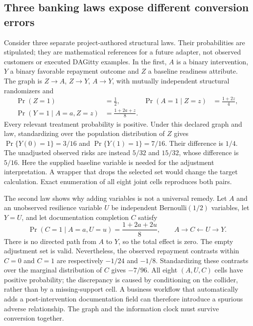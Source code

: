 \subsection{Three banking laws expose different conversion errors}
\label{exec18:gp-graph-laws}

Consider three separate project-authored structural laws. Their probabilities
are stipulated; they are mathematical references for a future adapter, not
observed customers or executed DAGitty examples. In the first, \(A\) is a
binary intervention, \(Y\) a binary favorable repayment outcome and \(Z\) a
baseline readiness attribute. The graph is \(Z\to A\), \(Z\to Y\),
\(A\to Y\), with mutually independent structural randomizers and
\begin{equation}
\label{exec18:gp-confounding}
 \begin{aligned}
 \Pr(Z=1)&=\frac12, &
 \Pr(A=1\mid Z=z)&=\frac{1+2z}{4},\\
 \Pr(Y=1\mid A=a,Z=z)&=\frac{1+2a+z}{8}.
 \end{aligned}
\end{equation}
Every relevant treatment probability is positive. Under this declared graph
and law, standardizing over the population distribution of \(Z\) gives
\(\Pr\{Y(0)=1\}=3/16\) and \(\Pr\{Y(1)=1\}=7/16\). Their difference is
\(1/4\). The unadjusted observed risks are instead \(5/32\) and \(15/32\),
whose difference is \(5/16\). Here the supplied baseline variable is needed
for the adjustment interpretation. A wrapper that drops the selected set
would change the target calculation. Exact enumeration of all eight joint
cells reproduces both pairs. \citep{exec18_gp_graph_reference}

The second law shows why adding variables is not a universal remedy. Let
\(A\) and an unobserved resilience variable \(U\) be independent
Bernoulli\((1/2)\) variables, let \(Y=U\), and let documentation completion
\(C\) satisfy
\begin{equation}
\label{exec18:gp-collider}
 \Pr(C=1\mid A=a,U=u)=\frac{1+2a+2u}{8},
 \qquad A\to C\leftarrow U\to Y.
\end{equation}
There is no directed path from \(A\) to \(Y\), so the total effect is zero.
The empty adjustment set is valid. Nevertheless, the observed repayment
contrasts within \(C=0\) and \(C=1\) are respectively \(-1/24\) and
\(-1/8\). Standardizing these contrasts over the marginal distribution
of \(C\) gives \(-7/96\). All eight \((A,U,C)\) cells have positive probability;
the discrepancy is caused by conditioning on the collider, rather than by
a missing-support cell. A business workflow that automatically adds a
post-intervention documentation field can therefore introduce a spurious
adverse relationship. The graph and the information clock must survive
conversion together. \citep{exec18_gp_graph_reference}

